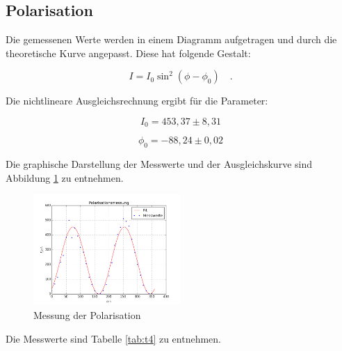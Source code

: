 \subsection{Polarisation}
Die gemessenen Werte werden in einem Diagramm aufgetragen und durch die theoretische Kurve angepasst. Diese hat folgende Gestalt:

\begin{equation}
I=I_0\sin^2{(\phi-\phi_0)}\quad.
\end{equation}

\noindent Die nichtlineare Ausgleichsrechnung ergibt für die Parameter:

\begin{equation*}
I_0=453,37\pm8,31
\end{equation*}

\begin{equation*}
\phi_0=-88,24\pm0,02
\end{equation*}

\noindent Die graphische Darstellung der Messwerte und der Ausgleichskurve sind Abbildung \ref{fig:pol} zu entnehmen.

\begin{figure}[H]
	\centering
	\includegraphics[width=0.5\textwidth]{plots/pol}
	\caption{Messung der Polarisation}
	\label{fig:pol}
\end{figure}

\noindent Die Messwerte sind Tabelle \ref{tab:t4} zu entnehmen.

